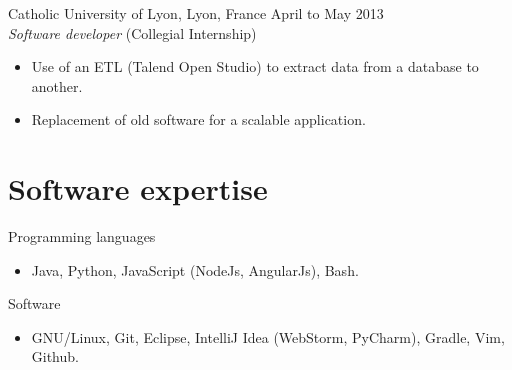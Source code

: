 \documentclass{res}
\newcommand{\inFrench}[1]{}
\newcommand{\inEnglish}[1]{#1}
\begin{document}
\begin{resume}
{	%
	Catholic University of Lyon, Lyon, France
	\hfill April to May 2013 \\
	{\sl Software developer} \hfill (Collegial Internship)
	\vspace{0.05in}

	\begin{itemize} \itemsep -2pt
		\item Use of an ETL (Talend Open Studio) to extract data from a database to another.
		\item Replacement of old software for a scalable application.
	\end{itemize}

}

\inFrench{
	\section{Connaissances informatiques}
}
\inEnglish{
	\section{Software expertise}
}
\vspace{6pt}

\inFrench{
	Langages de programmation
	\vspace{0.05in}
	\begin{itemize}
		\item Java, Python, JavaScript (NodeJs, AngularJs), Bash.
	\end{itemize}

	Logiciels maîtrisés
	\vspace{0.05in}
	\begin{itemize}
		\item GNU/Linux, Git, Eclipse, IntelliJ Idea (WebStorm, PyCharm), Gradle, Vim, Github.
	\end{itemize}
}

\inEnglish{
	Programming languages
	\vspace{0.05in}
	\begin{itemize}
		\item Java, Python, JavaScript (NodeJs, AngularJs), Bash.
	\end{itemize}

	Software
	\vspace{0.05in}
	\begin{itemize}
		\item GNU/Linux, Git, Eclipse, IntelliJ Idea (WebStorm, PyCharm), Gradle, Vim, Github.
	\end{itemize}
}


\end{resume}
\end{document}
